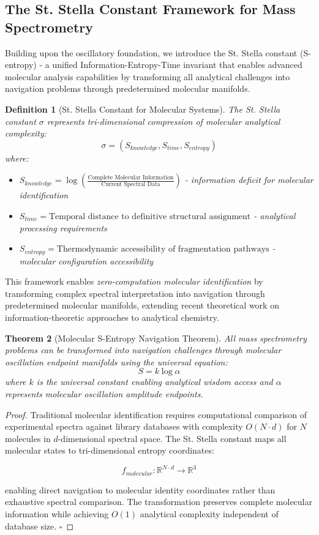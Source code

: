 \documentclass[11pt,a4paper]{article}
\newtheorem{theorem}{Theorem}[section]
\newtheorem{definition}[theorem]{Definition}
\theoremstyle{remark}
\begin{document}
\subsection{The St. Stella Constant Framework for Mass Spectrometry}

Building upon the oscillatory foundation, we introduce the St. Stella constant (S-entropy) - a unified Information-Entropy-Time invariant that enables advanced molecular analysis capabilities by transforming all analytical challenges into navigation problems through predetermined molecular manifolds.

\begin{definition}[St. Stella Constant for Molecular Systems]
The St. Stella constant $\sigma$ represents tri-dimensional compression of molecular analytical complexity:
$$\sigma = (S_{knowledge}, S_{time}, S_{entropy})$$
where:
\begin{itemize}
\item $S_{knowledge} = \log\left(\frac{\text{Complete Molecular Information}}{\text{Current Spectral Data}}\right)$ - information deficit for molecular identification
\item $S_{time} = \text{Temporal distance to definitive structural assignment}$ - analytical processing requirements  
\item $S_{entropy} = \text{Thermodynamic accessibility of fragmentation pathways}$ - molecular configuration accessibility
\end{itemize}
\end{definition}

This framework enables \emph{zero-computation molecular identification} by transforming complex spectral interpretation into navigation through predetermined molecular manifolds, extending recent theoretical work on information-theoretic approaches to analytical chemistry.

\begin{theorem}[Molecular S-Entropy Navigation Theorem]
All mass spectrometry problems can be transformed into navigation challenges through molecular oscillation endpoint manifolds using the universal equation:
$$S = k \log \alpha$$
where $k$ is the universal constant enabling analytical wisdom access and $\alpha$ represents molecular oscillation amplitude endpoints.
\end{theorem}

\begin{proof}
Traditional molecular identification requires computational comparison of experimental spectra against library databases with complexity $O(N \cdot d)$ for $N$ molecules in $d$-dimensional spectral space. The St. Stella constant maps all molecular states to tri-dimensional entropy coordinates:

$$f_{molecular}: \mathbb{R}^{N \cdot d} \rightarrow \mathbb{R}^3$$

enabling direct navigation to molecular identity coordinates rather than exhaustive spectral comparison. The transformation preserves complete molecular information while achieving $O(1)$ analytical complexity independent of database size. $\square$
\end{proof}
\end{document}

